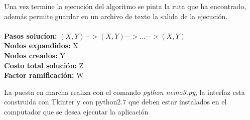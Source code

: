 Una vez termine la ejecuci\'on del algoritmo se pinta la ruta que ha encontrado, además permite guardar en un archivo de texto la salida de la ejecuci\'on.\\\\
\textbf{Pasos soluc\'ion:} \( (X,Y)->(X,Y)->...->(X,Y) \)\\
\textbf{Nodos expandidos:} X \\
\textbf{Nodos creados:} Y \\
\textbf{Costo total soluci\'on:} Z \\
\textbf{Factor ramificaci\'on:} W 

La puesta en marcha realiza con el comando \textit{python nemo3.py}, la interfaz esta construida con Tkinter y con python2.7 que deben estar instalados en el computador que se desea ejecutar la aplicaci\'on
